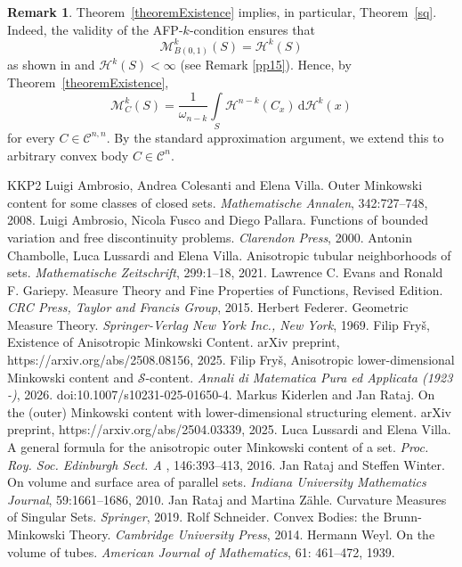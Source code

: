 \documentclass[pdflatex,sn-mathphys-num]{sn-jnl}
\theoremstyle{plain}
\theoremstyle{definition}
\newtheorem{rem}[theorem]{Remark}
\newcommand{\dH}[1]{\,\mathrm d\mathcal{H}^{#1}}
\begin{document}
\begin{rem}
Theorem~\ref{theoremExistence} implies, in particular, Theorem~\ref{sq}. Indeed, the validity of the AFP-$k$-condition ensures that
\[
\mathcal{M}^k_{B(0, 1)}(S) = \mathcal{H}^k(S)
\]
as shown in \cite[Theorem~2.104]{ambrosio} and $\mathcal{H}^k(S)<\infty$ (see Remark \ref{pp15}). Hence, by Theorem~\ref{theoremExistence},
\[
\mathcal{M}^k_{C}(S)
= \frac{1}{\omega_{n-k}}\int\limits_{S}\mathcal{H}^{n-k}(C_x)\dH{k}(x)
\]
for every $C \in \mathcal{C}^{n,n}$. By the standard approximation argument, we extend this to arbitrary convex body $C\in\mathcal{C}^n.$
\end{rem}


\begin{thebibliography}{KKP2}
Luigi Ambrosio, Andrea Colesanti and Elena Villa. Outer {M}inkowski content for some classes of closed sets. \textit{Mathematische Annalen}, 342:727--748, 2008.
Luigi Ambrosio, Nicola Fusco and Diego Pallara. Functions of bounded variation and free discontinuity problems. \textit{Clarendon Press}, 2000.
Antonin Chambolle, Luca Lussardi and Elena Villa. Anisotropic tubular neighborhoods of sets. \textit{Mathematische Zeitschrift}, 299:1--18, 2021.
Lawrence C. Evans and Ronald F. Gariepy. Measure Theory and Fine Properties of Functions, Revised Edition. \textit{CRC Press, Taylor and Francis Group}, 2015.
Herbert Federer. Geometric {M}easure {T}heory. \textit{ Springer-Verlag New York Inc., New York}, 1969.
 Filip Fryš, Existence of Anisotropic Minkowski Content. arXiv preprint, https://arxiv.org/abs/2508.08156, 2025.
 Filip Fryš, Anisotropic lower-dimensional Minkowski content and $\mathcal{S}$-content. \textit{Annali di Matematica Pura ed Applicata (1923 -)}, 2026. doi:10.1007/s10231-025-01650-4.
Markus Kiderlen and Jan Rataj. On the (outer) Minkowski content with lower-dimensional structuring element. arXiv preprint, https://arxiv.org/abs/2504.03339, 2025.
Luca Lussardi and Elena Villa. A general formula for the anisotropic outer {M}inkowski content of a set. \textit{Proc. Roy. Soc. Edinburgh Sect. A }, 146:393--413, 2016.
Jan Rataj and Steffen Winter. On volume and surface area of parallel sets. \textit{Indiana University Mathematics Journal}, 59:1661--1686, 2010.
Jan Rataj and Martina Zähle. Curvature Measures of Singular Sets. \textit{Springer}, 2019.
 Rolf Schneider. Convex {B}odies: the Brunn-{M}inkowski {T}heory. \textit{Cambridge University Press}, 2014.
Hermann Weyl. On the volume of tubes. \textit{ American Journal of Mathematics}, 61: 461--472, 1939.
\end{thebibliography}
\end{document}
